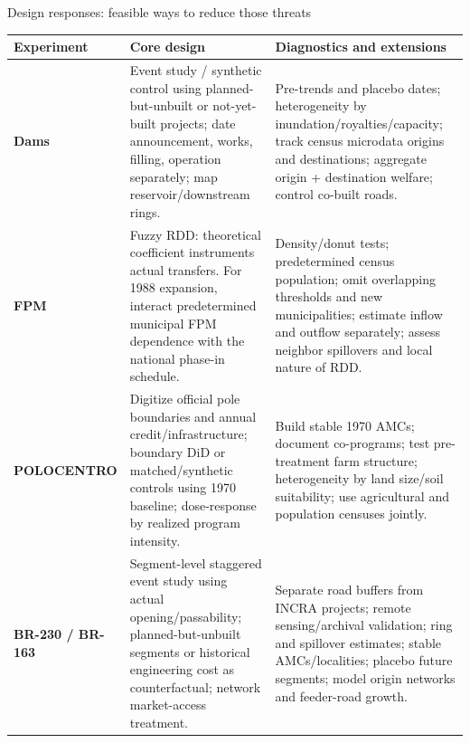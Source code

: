 \documentclass[aspectratio=169,10pt]{beamer}
\begin{document}
\begin{frame}{Design responses: feasible ways to reduce those threats}
\scriptsize
\renewcommand{\arraystretch}{1.19}
\begin{tabularx}{\textwidth}{L{2.05cm}YL{4.0cm}}
\toprule
\textbf{Experiment} & \textbf{Core design} & \textbf{Diagnostics and extensions} \\
\midrule
\textbf{Dams} & Event study / synthetic control using planned-but-unbuilt or not-yet-built projects; date announcement, works, filling, operation separately; map reservoir/downstream rings. & Pre-trends and placebo dates; heterogeneity by inundation/royalties/capacity; track census microdata origins and destinations; aggregate origin + destination welfare; control co-built roads. \\
\textbf{FPM} & Fuzzy RDD: theoretical coefficient instruments actual transfers. For 1988 expansion, interact predetermined municipal FPM dependence with the national phase-in schedule. & Density/donut tests; predetermined census population; omit overlapping thresholds and new municipalities; estimate inflow and outflow separately; assess neighbor spillovers and local nature of RDD. \\
\textbf{POLOCENTRO} & Digitize official pole boundaries and annual credit/infrastructure; boundary DiD or matched/synthetic controls using 1970 baseline; dose-response by realized program intensity. & Build stable 1970 AMCs; document co-programs; test pre-treatment farm structure; heterogeneity by land size/soil suitability; use agricultural and population censuses jointly. \\
\textbf{BR-230 / BR-163} & Segment-level staggered event study using actual opening/passability; planned-but-unbuilt segments or historical engineering cost as counterfactual; network market-access treatment. & Separate road buffers from INCRA projects; remote sensing/archival validation; ring and spillover estimates; stable AMCs/localities; placebo future segments; model origin networks and feeder-road growth. \\
\bottomrule
\end{tabularx}
\end{frame}
\end{document}
